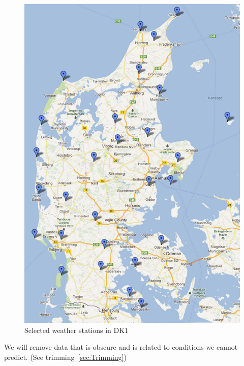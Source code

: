 \begin{figure}[H]
\centering
\includegraphics[width=0.85\linewidth,natwidth=898,natheight=587]{billeder/stations4average.png}
\caption{Selected weather stations in DK1}
\label{fig:stations4average}
\end{figure}


We will remove data that is obscure and is related to conditions we cannot predict. (See trimming~\ref{sec:Trimming})